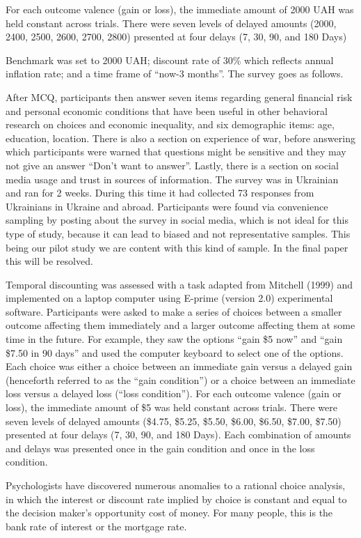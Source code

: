 \documentclass[
  letterpaper,
  DIV=11,
  numbers=noendperiod]{scrartcl}
\begin{document}
For each outcome valence (gain or loss), the immediate amount of 2000
UAH was held constant across trials. There were seven levels of delayed
amounts (2000, 2400, 2500, 2600, 2700, 2800) presented at four delays
(7, 30, 90, and 180 Days)

Benchmark was set to 2000 UAH; discount rate of 30\% which reflects
annual inflation rate; and a time frame of ``now-3 months''. The survey
goes as follows.

After MCQ, participants then answer seven items regarding general
financial risk and personal economic conditions that have been useful in
other behavioral research on choices and economic inequality, and six
demographic items: age, education, location. There is also a section on
experience of war, before answering which participants were warned that
questions might be sensitive and they may not give an answer ``Don't
want to answer''. Lastly, there is a section on social media usage and
trust in sources of information. The survey was in Ukrainian and ran for
2 weeks. During this time it had collected 73 responses from Ukrainians
in Ukraine and abroad. Participants were found via convenience sampling
by posting about the survey in social media, which is not ideal for this
type of study, because it can lead to biased and not representative
samples. This being our pilot study we are content with this kind of
sample. In the final paper this will be resolved.

Temporal discounting was assessed with a task adapted from Mitchell
(1999) and implemented on a laptop computer using E-prime (version 2.0)
experimental software. Participants were asked to make a series of
choices between a smaller outcome affecting them immediately and a
larger outcome affecting them at some time in the future. For example,
they saw the options ``gain \$5 now'' and ``gain \$7.50 in 90 days'' and
used the computer keyboard to select one of the options. Each choice was
either a choice between an immediate gain versus a delayed gain
(henceforth referred to as the ``gain condition'') or a choice between
an immediate loss versus a delayed loss (``loss condition''). For each
outcome valence (gain or loss), the immediate amount of \$5 was held
constant across trials. There were seven levels of delayed amounts
(\$4.75, \$5.25, \$5.50, \$6.00, \$6.50, \$7.00, \$7.50) presented at
four delays (7, 30, 90, and 180 Days). Each combination of amounts and
delays was presented once in the gain condition and once in the loss
condition.

Psychologists have discovered numerous anomalies to a rational choice
analysis, in which the interest or discount rate implied by choice is
constant and equal to the decision maker's opportunity cost of money.
For many people, this is the bank rate of interest or the mortgage rate.
\end{document}
